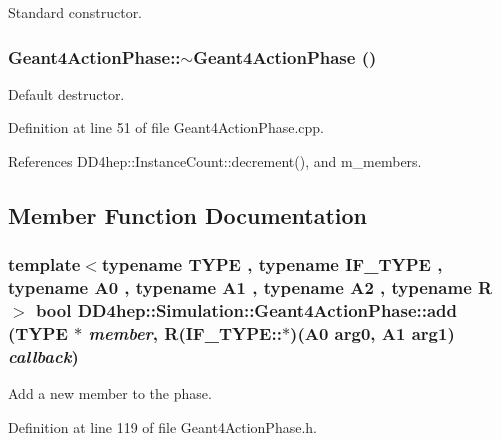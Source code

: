 Standard constructor. \hypertarget{class_d_d4hep_1_1_simulation_1_1_geant4_action_phase_ae2d320d1dd7f433b5defb6f4fed5d757}{
\subsubsection[{$\sim$Geant4ActionPhase}]{\setlength{\rightskip}{0pt plus 5cm}Geant4ActionPhase::$\sim$Geant4ActionPhase ()}}
\label{class_d_d4hep_1_1_simulation_1_1_geant4_action_phase_ae2d320d1dd7f433b5defb6f4fed5d757}


Default destructor. 

Definition at line 51 of file Geant4ActionPhase.cpp.

References DD4hep::InstanceCount::decrement(), and m\_\-members.

\subsection{Member Function Documentation}
\hypertarget{class_d_d4hep_1_1_simulation_1_1_geant4_action_phase_ad63f4a395da9d021994d58bd8b1ce015}{
\subsubsection[{add}]{\setlength{\rightskip}{0pt plus 5cm}template$<$typename TYPE , typename IF\_\-TYPE , typename A0 , typename A1 , typename A2 , typename R $>$ bool DD4hep::Simulation::Geant4ActionPhase::add (TYPE $\ast$ {\em member}, \/  R(IF\_\-TYPE::$\ast$)(A0 arg0, A1 arg1) {\em callback})}}
\label{class_d_d4hep_1_1_simulation_1_1_geant4_action_phase_ad63f4a395da9d021994d58bd8b1ce015}


Add a new member to the phase. 

Definition at line 119 of file Geant4ActionPhase.h.


